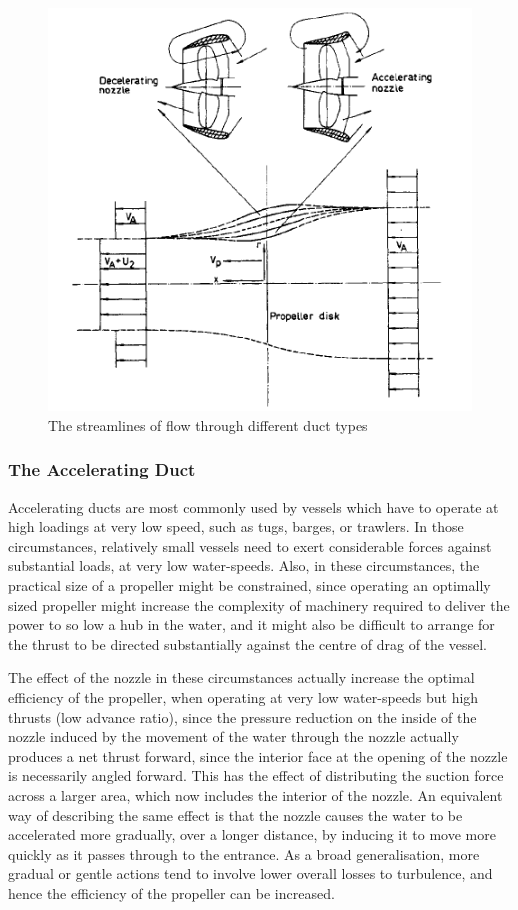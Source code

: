 \documentclass{article}\usepackage[]{graphicx}\usepackage[]{color}
\begin{document}
\begin{figure}
\includegraphics[width=\textwidth]{DuctStreamlines.png}
\caption{The streamlines of flow through different duct types \parencite[214]{lewis1988}}
\label{fig:DuctStreamlines.png}
\end{figure}

\subsubsection{The Accelerating Duct}
Accelerating ducts are most commonly used by vessels which have to operate at high loadings at very low speed, such as tugs, barges, or trawlers.  In those circumstances, relatively small vessels need to exert considerable forces against substantial loads, at very low water-speeds.  Also, in these circumstances, the practical size of a propeller might be constrained, since operating an optimally sized propeller might increase the complexity of machinery required to deliver the power to so low a hub in the water, and it might also be difficult to arrange for the thrust to be directed substantially against the centre of drag of the vessel.

The effect of the nozzle in these circumstances actually increase the optimal efficiency of the propeller, when operating at very low water-speeds but high thrusts (low advance ratio), since the pressure reduction on the inside of the nozzle induced by the movement of the water through the nozzle actually produces a net thrust forward, since the interior face at the opening of the nozzle is necessarily angled forward. This has the effect of distributing the suction force across a larger area, which now includes the interior of the nozzle.  An equivalent way of describing the same effect is that the nozzle causes the water to be accelerated more gradually, over a longer distance, by inducing it to move more quickly as it passes through to the entrance.  As a broad generalisation, more gradual or gentle actions tend to involve lower overall losses to turbulence, and hence the efficiency of the propeller can be increased.
\end{document}
